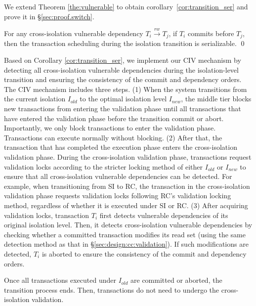 We extend Theorem \ref{the:vulnerable} to obtain corollary~\ref{cor:transition_ser} and prove it in \S\ref{sec:proof.switch}. 
\begin{corollary}
    \label{cor:transition_ser}
    For any cross-isolation vulnerable dependency $T_i \xrightarrow{rw} T_j$, if $T_i$ commits before $T_j$, then the transaction scheduling during the isolation transition is serializable.
\qed
\end{corollary}

Based on Corollary \ref{cor:transition_ser}, we implement our CIV mechanism by detecting all cross-isolation vulnerable dependencies during the isolation-level transition and ensuring the consistency of the commit and dependency orders. The CIV mechanism includes three steps. (1) When the system transitions from the current isolation $I_{old}$ to the optimal isolation level $I_{new}$, the middle tier blocks new transactions from entering the validation phase until all transactions that have entered the validation phase before the transition commit or abort. Importantly, we only block transactions to enter the validation phase. Transactions can execute normally without blocking. (2) After that, the transaction that has completed the execution phase enters the cross-isolation validation phase. During the cross-isolation validation phase, transactions request validation locks according to the stricter locking method of either $I_{old}$ or $I_{new}$ to ensure that all cross-isolation vulnerable dependencies can be detected. For example, when transitioning from SI to RC, the transaction in the cross-isolation validation phase requests validation locks following RC's validation locking method, regardless of whether it is executed under SI or RC. (3) After acquiring validation locks, transaction $T_i$ first detects vulnerable dependencies of its original isolation level. Then, it detects cross-isolation vulnerable dependencies by checking whether a committed transaction modifies its read set (using the same detection method as that in \S\ref{sec:design:cc:validation}). If such modifications are detected, $T_i$ is aborted to ensure the consistency of the commit and dependency orders. 

Once all transactions executed under $I_{old}$ are committed or aborted, the transition process ends. Then, transactions do not need to undergo the cross-isolation validation.

